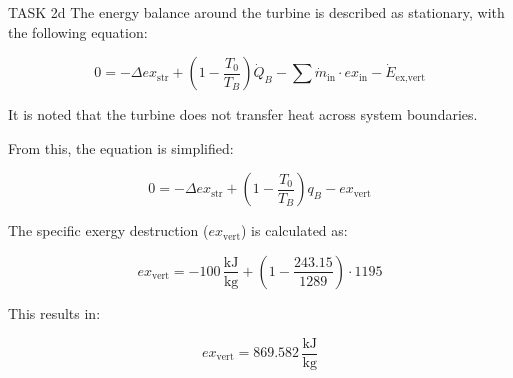 TASK 2d  
The energy balance around the turbine is described as stationary, with the following equation:  

\[
0 = -\Delta ex_{\text{str}} + \left( 1 - \frac{T_0}{T_B} \right) \dot{Q}_B - \sum \dot{m}_{\text{in}} \cdot ex_{\text{in}} - \dot{E}_{\text{ex,vert}}
\]

It is noted that the turbine does not transfer heat across system boundaries.  

From this, the equation is simplified:  

\[
0 = -\Delta ex_{\text{str}} + \left( 1 - \frac{T_0}{T_B} \right) q_B - ex_{\text{vert}}
\]

The specific exergy destruction (\( ex_{\text{vert}} \)) is calculated as:  

\[
ex_{\text{vert}} = -100 \, \frac{\text{kJ}}{\text{kg}} + \left( 1 - \frac{243.15}{1289} \right) \cdot 1195
\]

This results in:  

\[
ex_{\text{vert}} = 869.582 \, \frac{\text{kJ}}{\text{kg}}
\]
